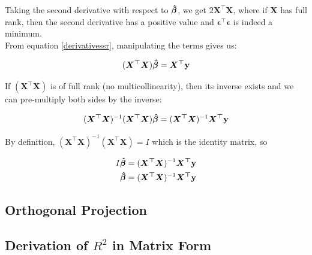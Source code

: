 \documentclass{article}
\begin{document}
\noindent Taking the second derivative with respect to $\bm{\Hat{\beta}}$, we get $2\bm{X^\top X}$, where if $\bm{X}$ has full rank, then the second derivative has a positive value and $\bm{\epsilon^\top \epsilon}$ is indeed a minimum. \\

\noindent From equation \ref{derivativessr}, manipulating the terms gives us:

\begin{equation}
    (\bm{X^\top X})\bm{\Hat{\beta}} = \bm{X^\top} \mathbf{y}
\end{equation}

\noindent If $(\bm{X^\top X})$ is of full rank (no multicollinearity), then its inverse exists and we can pre-multiply both sides by the inverse:

\begin{equation}
    (\bm{X^\top X})^{-1} (\bm{X^\top X})\bm{\Hat{\beta}} = (\bm{X^\top X})^{-1} \bm{X^\top} \mathbf{y}
\end{equation}

\noindent By definition, $(\bm{X^\top X})^{-1} (\bm{X^\top X}) = I$ which is the identity matrix, so 

\begin{align}\label{eqn:olsbetahat}
    \nonumber I \bm{\Hat{\beta}} &= (\bm{X^\top X})^{-1} \bm{X^\top} \mathbf{y} \\
    \bm{\Hat{\beta}} &= (\bm{X^\top X})^{-1} \bm{X^\top} \mathbf{y}
\end{align}

\subsection{Orthogonal Projection}


\subsection{Derivation of $R^2$ in Matrix Form}

\end{document}
